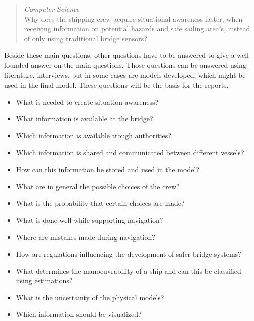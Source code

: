 \begin{quote}
	\emph{Computer Science}\\
	Why does the shipping crew acquire situational awareness faster, when receiving information on potential hazards and safe sailing area's, instead of only using traditional bridge sensors?
\end{quote}

Beside these main questions, other questions have to be answered to give a well founded answer on the main questions. Those questions can be answered using literature, interviews, but in some cases are models developed, which might be used in the final model. These questions will be the basis for the reports. 

\begin{itemize}
	\item What is needed to create situation awareness?
	\item What information is available at the bridge?
	\item Which information is available trough authorities?
	\item Which information is shared and communicated between different vessels?
	\item How can this information be stored and used in the model?
	\item What are in general the possible choices of the crew?
	\item What is the probability that certain choices are made?\\
	
	\item What is done well while supporting navigation?
	\item Where are mistakes made during navigation?
	\item How are regulations influencing the development of safer bridge systems?\\

	\item What determines the manoeuvrability of a ship and can this be classified using estimations?
	\item What is the uncertainty of the physical models?
	\item Which information should be visualized?
\end{itemize}


